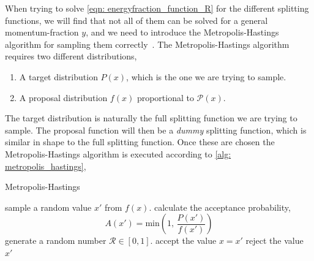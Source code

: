 \documentclass[main.tex]{subfiles}
\begin{document}
When trying to solve \autoref{eqn: energyfraction_function_R} for the different splitting functions, we will find that not all of them can be solved for a general momentum-fraction \(y\), and we need to introduce the Metropolis-Hastings algorithm for sampling them correctly~\cite{MCMC_andrieu2003}. The Metropolis-Hastings algorithm requires two different distributions,
\begin{enumerate}[1)]
    \item A target distribution \(P(x)\), which is the one we are trying to sample.
    \item A proposal distribution \(f(x)\) proportional to \(\mathcal{P}(x)\).
\end{enumerate}
The target distribution is naturally the full splitting function we are trying to sample. The proposal function will then be a \textit{dummy} splitting function, which is similar in shape to the full splitting function. Once these are chosen the Metropolis-Hastings algorithm is executed according to \autoref{alg: metropolis_hastings},
\begin{center}
\begin{minipage}{.8\linewidth}
\begin{algorithm}[H]
\caption{Metropolis-Hastings}
\label{alg: metropolis_hastings}
\begin{algorithmic}[1]
    \State sample a random value \(x'\) from \(f(x)\).
    \State calculate the acceptance probability, \[A(x') = \text{min} \left(1, \, \frac{P(x')}{f(x')}\right)\]
    \State generate a random number \(\mathcal{R}\in [0,1]\).
        \Statey accept the value \(x = x'\)
        \Statey reject the value \(x'\)
    \EndIf
\end{algorithmic}
\end{algorithm}
\end{minipage}
\end{center}
\end{document}
